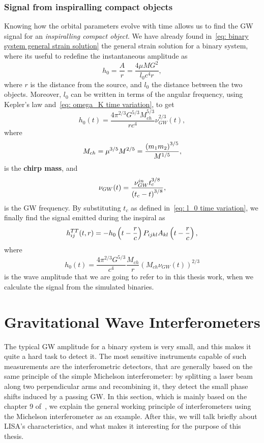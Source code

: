 \subsubsection{Signal from inspiralling compact objects}
Knowing how the orbital parameters evolve with time allows us to find the GW signal for an \textit{inspiralling compact object}.
We have already found in~\eqref{eq: binary system general strain solution} the general strain solution for a binary system, where its useful to redefine the instantaneous amplitude as
\[
    h_0 = \frac{A}{r} = \frac{4\mu M G^2}{l_0c^4r},
\]
where $r$ is the distance from the source, and $l_0$ the distance between the two objects.
Moreover, $l_0$ can be written in terms of the angular frequency, using Kepler's law and~\eqref{eq: omega_K time variation}, to get
\[
    h_0(t)=\frac{4\pi^{2/3}G^{5/3}M_{ch}^{5/3}}{rc^4}\nu_{GW}^{2/3}(t),
\]
where
\begin{equation}
    M_{ch} = \mu^{3/5}M^{2/5} = \frac{{(m_1m_2)}^{3/5}}{M^{1/5}},
    \notag
\end{equation}
is the \textbf{chirp mass}, and 
\begin{equation}
    \nu_{GW}(t)=\frac{\nu_{GW}^{in}t_c^{3/8}}{{(t_c-t)}^{3/8}},
    \notag
\end{equation}
is the GW frequency.
By substituting $t_c$ as defined in~\eqref{eq: l_0 time variation}, we finally find the signal emitted during the inspiral as
\begin{equation}
    h_{ij}^{TT}(t,r)= -h_0\left(t-\frac{r}{c}\right)P_{ijkl}A_{kl}\left(t-\frac{r}{c}\right),
    \notag
\end{equation}
where
\begin{equation}
    \boxed{h_0(t)= \frac{4\pi^{2/3}G^{5/3}}{c^4}\frac{M_{ch}}{r}{(M_{ch}\nu_{GW}(t))}^{2/3}}
    \label{eq: the strain we use}
\end{equation}
is the wave amplitude that we are going to refer to in this thesis work, when we calculate the signal from the simulated binaries.

\section{Gravitational Wave Interferometers}
The typical GW amplitude for a binary system is very small, and this makes it quite a hard task to detect it.
The most sensitive instruments capable of such measurements are the interferometric detectors, that are generally based on the same principle of the simple Michelson interferometer: by splitting a laser beam along two perpendicular arms and recombining it, they detect the small phase shifts induced by a passing GW.\@  
In this section, which is mainly based on the chapter 9 of~\cite{Maggiore}, we explain the general working principle of interferometers using the Michelson interferometer as an example.
After this, we will talk briefly about LISA's characteristics, and what makes it interesting for the purpose of this thesis.

